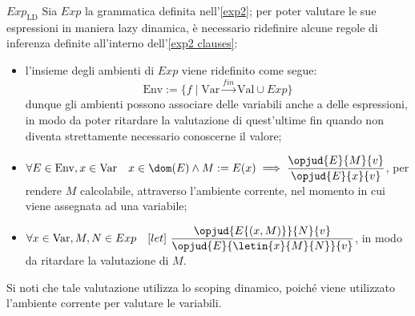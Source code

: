 \documentclass[a4paper, 12pt]{report}
\begin{document}
    \begin{framedobs}{$Exp_\mathrm{LD}$}
        Sia $Exp$ la grammatica definita nell'\cref{exp2}; per poter valutare le sue espressioni in maniera lazy dinamica, è necessario ridefinire alcune regole di inferenza definite all'interno dell'\cref{exp2 clauses}:

        \begin{itemize}
            \item l'insieme degli ambienti di $Exp$ viene ridefinito come segue: $$\mathrm{Env} := \{f \mid \mathrm{Var} \xrightarrow{fin} \mathrm{Val} \cup Exp\}$$ dunque gli ambienti possono associare delle variabili anche a delle espressioni, in modo da poter ritardare la valutazione di quest'ultime fin quando non diventa strettamente necessario conoscerne il valore;
            \item $\forall E \in \mathrm{Env}, x \in \mathrm{Var} \quad x \in \dom(E) \land M := E(x) \implies \dfrac{\opjud{E}{M}{v}}{\opjud{E}{x}{v}}$, per rendere $M$ calcolabile, attraverso l'ambiente corrente, nel momento in cui viene assegnata ad una variabile;
            \item $\forall x \in \mathrm{Var}, M, N \in Exp \quad [let] \ \dfrac{\opjud{E\{(x, M)\}}{N}{v}}{\opjud{E}{\letin{x}{M}{N}}{v}}$, in modo da ritardare la valutazione di $M$.
        \end{itemize}

        Si noti che tale valutazione utilizza lo scoping dinamico, poiché viene utilizzato l'ambiente corrente per valutare le variabili.
    \end{framedobs}
\end{document}
